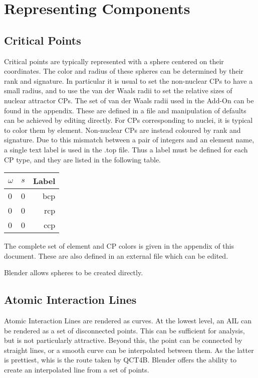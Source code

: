 \documentclass{report}
\begin{document}
\section{Representing Components}

\subsection{Critical Points}
Critical points are typically represented with a sphere centered on their coordinates.
The color and radius of these spheres can be determined by their rank and signature.
In particular it is usual to set the non-nuclear CPs to have a small radius, and to use the 
van der Waals radii to set the relative sizes of nuclear attractor CPs.
The set of van der Waals radii used in the Add-On can be found in the appendix.
These are defined in a file and manipulation of defaults can be achieved by editing directly.
For CPs corresponding to nuclei, it is typical to color them by element.
Non-nuclear CPs are instead coloured by rank and signature.
Due to this mismatch between a pair of integers and an element name, a single text label is used in the .top file.
Thus a label must be defined for each CP type, and they are listed in the following table.

\begin{tabular}{ l c || r }
$\omega$ & $s$ & Label \\
\hline
0 & 0 & bcp \\
0 & 0 & rcp \\
0 & 0 & ccp \\
\end{tabular}

The complete set of element and CP colors is given in the appendix of this document. 
These are also defined in an external file which can be edited.

Blender allows spheres to be created directly.

\subsection{Atomic Interaction Lines}

Atomic Interaction Lines are rendered as curves.
At the lowest level, an AIL can be rendered as a set of disconnected points.
This can be sufficient for analysis, but is not particularly attractive.
Beyond this, the point can be connected by straight lines, or a smooth curve can be interpolated between them.
As the latter is prettiest, whis is the route taken by QCT4B.
Blender offers the ability to create an interpolated line from a set of points.
\end{document}
